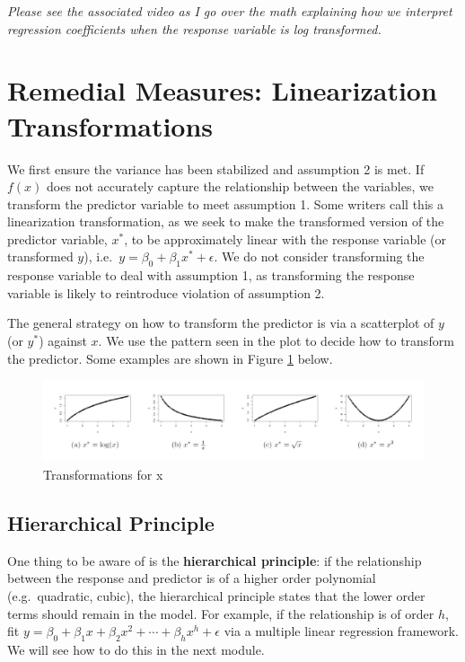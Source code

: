 \documentclass[
]{book}
\begin{document}
\emph{Please see the associated video as I go over the math explaining how we interpret regression coefficients when the response variable is log transformed.}

\hypertarget{remedial-measures-linearization-transformations}{%
\section{Remedial Measures: Linearization Transformations}\label{remedial-measures-linearization-transformations}}

We first ensure the variance has been stabilized and assumption 2 is met. If \(f(x)\) does not accurately capture the relationship between the variables, we transform the predictor variable to meet assumption 1. Some writers call this a linearization transformation, as we seek to make the transformed version of the predictor variable, \(x^*\), to be approximately linear with the response variable (or transformed \(y\)), i.e.~\(y = \beta_0 + \beta_1 x^* + \epsilon\). We do not consider transforming the response variable to deal with assumption 1, as transforming the response variable is likely to reintroduce violation of assumption 2.

The general strategy on how to transform the predictor is via a scatterplot of \(y\) (or \(y^*\)) against \(x\). We use the pattern seen in the plot to decide how to transform the predictor. Some examples are shown in Figure \ref{fig:xstar} below.

\begin{figure}
\centering
\includegraphics{images/xstar.jpg}
\caption{\label{fig:xstar}Transformations for x}
\end{figure}

\hypertarget{hierarchical-principle}{%
\subsection{Hierarchical Principle}\label{hierarchical-principle}}

One thing to be aware of is the \textbf{hierarchical principle}: if the relationship between the response and predictor is of a higher order polynomial (e.g.~quadratic, cubic), the hierarchical principle states that the lower order terms should remain in the model. For example, if the relationship is of order \(h\), fit \(y = \beta_0 + \beta_1 x + \beta_2 x^2 + \cdots + \beta_h x^h + \epsilon\) via a multiple linear regression framework. We will see how to do this in the next module.
\end{document}
